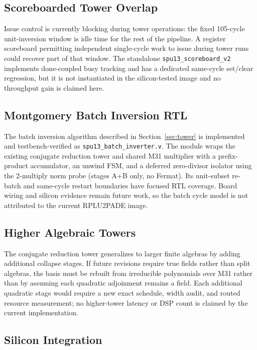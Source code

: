 \documentclass[conference]{IEEEtran}
\begin{document}
\subsection{Scoreboarded Tower Overlap}

Issue control is currently blocking during tower operations: the fixed
105-cycle unit-inversion window is idle time for the rest of the pipeline.
A register scoreboard permitting independent single-cycle work to issue
during tower runs could recover part of that window. The standalone
\texttt{spu13\_scoreboard\_v2} implements done-coupled busy tracking and has a
dedicated same-cycle set/clear regression, but it is not instantiated in the
silicon-tested image and no throughput gain is claimed here.

\subsection{Montgomery Batch Inversion RTL}

The batch inversion algorithm described in Section~\ref{sec:tower} is
implemented and testbench-verified as \texttt{spu13\_batch\_inverter.v}.
The module wraps the
existing conjugate reduction tower and shared M31 multiplier with a
prefix-product accumulator, an unwind FSM, and a deferred zero-divisor
isolator using the 2-multiply norm probe (stages A+B only, no Fermat).
Its unit-subset re-batch and same-cycle restart boundaries have focused RTL
coverage. Board wiring and silicon evidence remain future work, so the batch
cycle model is not attributed to the current RPLU2PADE image.

\subsection{Higher Algebraic Towers}

The conjugate reduction tower generalizes to larger finite algebras by adding
additional collapse stages. If future revisions require true fields rather
than split algebras, the basis must be rebuilt from irreducible polynomials
over M31 rather than by assuming each quadratic adjoinment remains a field.
Each additional quadratic stage would require a new exact schedule, width
audit, and routed resource measurement; no higher-tower latency or DSP count
is claimed by the current implementation.

\subsection{Silicon Integration}
\end{document}
